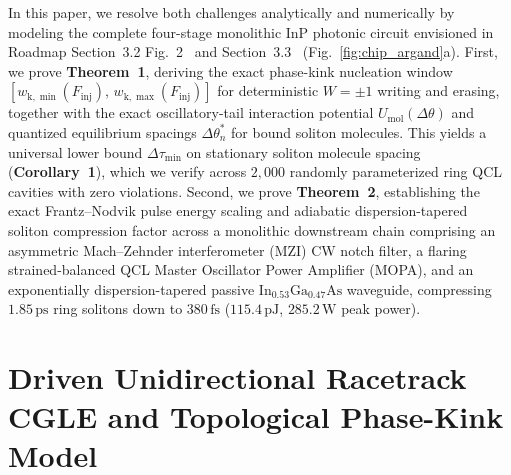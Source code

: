 \documentclass[11pt,letterpaper]{article}
\begin{document}
In this paper, we resolve both challenges analytically and numerically by modeling the complete four-stage monolithic InP photonic circuit envisioned in Roadmap Section~3.2 Fig.~2~\cite{ColumboRoadmap2025} and Section~3.3~\cite{DhillonRoadmap2025} (Fig.~\ref{fig:chip_argand}a). First, we prove \textbf{Theorem~1}, deriving the exact phase-kink nucleation window $[w_{\mathrm{k},\min}(F_{\mathrm{inj}}),\,w_{\mathrm{k},\max}(F_{\mathrm{inj}})]$ for deterministic $W = \pm 1$ writing and erasing, together with the exact oscillatory-tail interaction potential $U_{\mathrm{mol}}(\Delta\theta)$ and quantized equilibrium spacings $\Delta\theta_n^*$ for bound soliton molecules. This yields a universal lower bound $\Delta\tau_{\min}$ on stationary soliton molecule spacing (\textbf{Corollary~1}), which we verify across $2{,}000$ randomly parameterized ring QCL cavities with zero violations. Second, we prove \textbf{Theorem~2}, establishing the exact Frantz--Nodvik pulse energy scaling and adiabatic dispersion-tapered soliton compression factor across a monolithic downstream chain comprising an asymmetric Mach--Zehnder interferometer (MZI) CW notch filter, a flaring strained-balanced QCL Master Oscillator Power Amplifier (MOPA), and an exponentially dispersion-tapered passive $\mathrm{In}_{0.53}\mathrm{Ga}_{0.47}\mathrm{As}$ waveguide, compressing $1.85\,\mathrm{ps}$ ring solitons down to $380\,\mathrm{fs}$ ($115.4\,\mathrm{pJ}$, $285.2\,\mathrm{W}$ peak power).

\section{Driven Unidirectional Racetrack CGLE and Topological Phase-Kink Model}
\label{sec:model}
\end{document}

